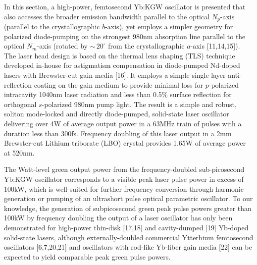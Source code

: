 In this section, a high-power, femtosecond Yb:KGW oscillator is presented that also accesses the broader emission bandwidth parallel to the optical $N_p$-axis (parallel to the crystallographic $b$-axis), yet employs a simpler geometry for polarized diode-pumping on the strongest 980nm absorption line parallel to the optical $N_m$-axis (rotated by $\sim\,20^\circ$ from the crystallographic $a$-axis [11,14,15]).
The laser head design is based on the thermal lens shaping (TLS) technique developed in-house for astigmatism compensation in diode-pumped Nd-doped lasers with Brewster-cut gain media [16].
It employs a simple single layer  anti-reflection coating on the gain medium to provide minimal loss for $p$-polarized intracavity 1040nm laser radiation and less than 0.5\% surface reflection for orthogonal $s$-polarized 980nm pump light.
The result is a simple and robust, soliton mode-locked and directly diode-pumped, solid-state laser oscillator delivering over 4W of average output power in a 63MHz train of pulses with a duration less than 300fs.
Frequency doubling of this laser output in a 2mm Brewster-cut Lithium triborate (LBO) crystal provides 1.65W of average power at 520nm.

The Watt-level green output power from the frequency-doubled sub-picosecond Yb:KGW oscillator corresponds to a visible peak laser pulse power in excess of 100kW, which is well-suited for further frequency conversion through harmonic generation or pumping of an ultrashort pulse optical parametric oscillator.
To our knowledge, the generation of subpicosecond green peak pulse powers greater than 100kW by frequency doubling the output of a laser oscillator has only been demonstrated for high-power thin-disk [17,18] and cavity-dumped [19] Yb-doped solid-state lasers, although externally-doubled commercial Ytterbium femtosecond oscillators [6,7,20,21] and oscillators with rod-like Yb-fiber gain media [22] can be expected to yield comparable peak green pulse powers.

